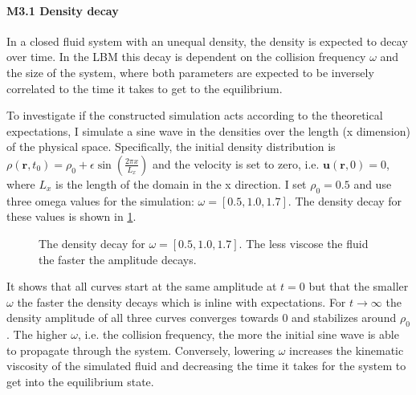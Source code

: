\documentclass[a4paper,12pt, oneside]{book}
\begin{document}

\paragraph{M3.1 Density decay} 
In a closed fluid system with an unequal density, the density is expected to decay over time. In the LBM this decay is dependent on the collision frequency $\omega$ and the size of the system, where both parameters are expected to be inversely correlated to the time it takes to get to the equilibrium.

To investigate if the constructed simulation acts according to the theoretical expectations, I simulate a sine wave in the densities over the length (x dimension) of the physical space.
Specifically, the initial density distribution is $\rho (\textbf{r},t_{0})=\rho_{0}+\epsilon \sin \left( \frac{2\pi x}{L_{x}} \right)$ and the velocity is set to zero, i.e. $\textbf{u}(\textbf{r},0)=0$, where $L_{x}$ is the length of the domain in the x direction.
I set $\rho_{0}=0.5$ and use three omega values for the simulation: $\omega=[0.5,1.0,1.7]$.
The density decay for these values is shown in \ref{fig:m3-1}.
\begin{figure}[ht]
\centering
\resizebox{\columnwidth}{!}{\large}
\vspace*{-10mm}
\caption[Density decay]{The density decay for $\omega=[0.5,1.0,1.7]$. The less viscose the fluid the faster the amplitude decays.}
\label{fig:m3-1}
\end{figure}
It shows that all curves start at the same amplitude at $t=0$ but that the smaller $\omega$ the faster the density decays which is inline with expectations. 
For $t\rightarrow \infty$ the density amplitude of all three curves converges towards $0$ and stabilizes around $\rho_{0}$.
The higher $\omega$, i.e. the collision frequency, the more the initial sine wave is able to propagate through the system. Conversely, lowering $\omega$ increases the kinematic viscosity of the simulated fluid and decreasing the time it takes for the system to get into the equilibrium state.

\end{document}
